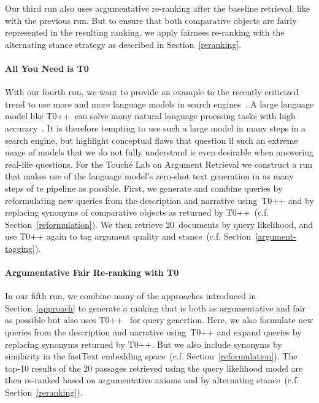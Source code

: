Our third run also uses argumentative re-ranking after the baseline retrieval, like with the previous run. But to ensure that both comparative objects are fairly represented in the resulting ranking, we apply fairness re-ranking with the alternating stance strategy as described in Section~\ref{reranking}.

\paragraph{All You Need is T0}

With our fourth run, we want to provide an example to the recently criticized trend to use more and more language models in search engines~\cite{ShahB2022}.
A large language model like T0++~can solve many natural language proessing tasks with high accuracy~\cite{SanhWRBSACSLRDBXTSSKCNDCJWMSYPBWNRSSFFTBGBWR2021}.
It is therefore tempting to use such a large model in many steps in a search engine, but \citet{ShahB2022} highlight conceptual flaws that question if such an extreme usage of models that we do not fully understand is even desirable when answering real-life questions.
For the Touché Lab on Argument Retrieval we construct a run that makes use of the language model's zero-shot text generation in as many steps of te pipeline as possible.
First, we generate and combine queries by reformulating new queries from the description and narrative using~T0++ and by replacing synonyms of comparative objects as returned by T0++~(c.f. Section~\ref{reformulation}).
We then retrieve 20~documents by query likelihood, and use T0++ again to tag argument quality and stance~(c.f. Section~\ref{argument-tagging}).

\paragraph{Argumentative Fair Re-ranking with T0}

In our fifth run, we combine many of the approaches introduced in Section~\ref{approach} to generate a ranking that is both as argumentative and fair as possible but also uses T0++~\cite{SanhWRBSACSLRDBXTSSKCNDCJWMSYPBWNRSSFFTBGBWR2021} for query genertion.
Here, we also formulate new queries from the description and narrative using~T0++ and expand queries by replacing synonyms returned by T0++. But we also include synonyms by similarity in the fastText embedding space~(c.f. Section~\ref{reformulation}).
The top-10 results of the 20 passages retrieved using the query likelihood model are then re-ranked based on argumentative axioms and by alternating stance~(c.f. Section~\ref{reranking}).

